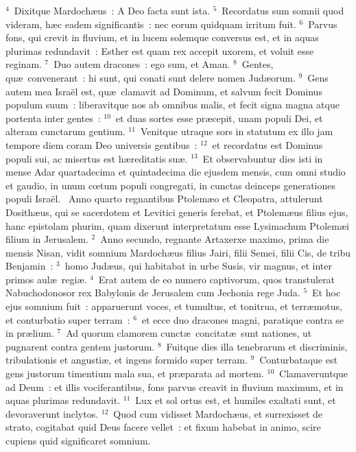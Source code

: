 ${}^{4}$~Dixitque Mardoch\ae us~: A Deo facta sunt ista.
${}^{5}$~Recordatus sum somnii quod videram, h\ae c eadem significantis~: nec eorum quidquam irritum fuit.
${}^{6}$~Parvus fons, qui crevit in fluvium, et in lucem solemque conversus est, et in aquas plurimas redundavit~: Esther est quam rex accepit uxorem, et voluit esse reginam.
${}^{7}$~Duo autem dracones~: ego sum, et Aman.
${}^{8}$~Gentes, qu\ae\ convenerant~: hi sunt, qui conati sunt delere nomen Jud\ae orum.
${}^{9}$~Gens autem mea Isra\"el est, qu\ae\ clamavit ad Dominum, et salvum fecit Dominus populum suum~: liberavitque nos ab omnibus malis, et fecit signa magna atque portenta inter gentes~:
${}^{10}$~et duas sortes esse pr\ae cepit, unam populi Dei, et alteram cunctarum gentium.
${}^{11}$~Venitque utraque sors in statutum ex illo jam tempore diem coram Deo universis gentibus~:
${}^{12}$~et recordatus est Dominus populi sui, ac misertus est h\ae reditatis su\ae .
${}^{13}$~Et observabuntur dies isti in mense Adar quartadecima et quintadecima die ejusdem mensis, cum omni studio et gaudio, in unum cœtum populi congregati, in cunctas deinceps generationes populi Isra\"el.
~Anno quarto regnantibus Ptolem\ae o et Cleopatra, attulerunt Dosith\ae us, qui se sacerdotem et Levitici generis ferebat, et Ptolem\ae us filius ejus, hanc epistolam phurim, quam dixerunt interpretatum esse Lysimachum Ptolem\ae i filium in Jerusalem.
${}^{2}$~Anno secundo, regnante Artaxerxe maximo, prima die mensis Nisan, vidit somnium Mardoch\ae us filius Jairi, filii Semei, filii Cis, de tribu Benjamin~:
${}^{3}$~homo Jud\ae us, qui habitabat in urbe Susis, vir magnus, et inter primos aul\ae\ regi\ae .
${}^{4}$~Erat autem de eo numero captivorum, quos transtulerat Nabuchodonosor rex Babylonis de Jerusalem cum Jechonia rege Juda.
${}^{5}$~Et hoc ejus somnium fuit~: apparuerunt voces, et tumultus, et tonitrua, et terr\ae motus, et conturbatio super terram~:
${}^{6}$~et ecce duo dracones magni, paratique contra se in pr\ae lium.
${}^{7}$~Ad quorum clamorem cunct\ae\ concitat\ae\ sunt nationes, ut pugnarent contra gentem justorum.
${}^{8}$~Fuitque dies illa tenebrarum et discriminis, tribulationis et angusti\ae , et ingens formido super terram.
${}^{9}$~Conturbataque est gens justorum timentium mala sua, et pr\ae parata ad mortem.
${}^{10}$~Clamaveruntque ad Deum~: et illis vociferantibus, fons parvus creavit in fluvium maximum, et in aquas plurimas redundavit.
${}^{11}$~Lux et sol ortus est, et humiles exaltati sunt, et devoraverunt inclytos.
${}^{12}$~Quod cum vidisset Mardoch\ae us, et surrexisset de strato, cogitabat quid Deus facere vellet~: et fixum habebat in animo, scire cupiens quid significaret somnium.
